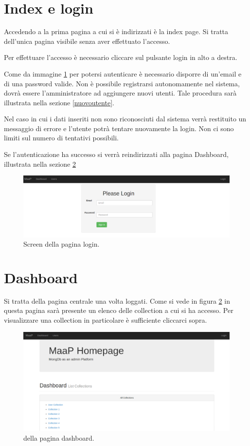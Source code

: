\section{Index e login}

Accedendo a \ProjectName{} la prima pagina a cui si è indirizzati è la index page.
Si tratta dell'unica pagina visibile senza aver effettuato l'accesso.

Per effettuare l'accesso è necessario cliccare sul pulsante login in alto a destra.

Come da immagine \ref{loginfig} per potersi autenticare è necessario disporre di un'email e di una password valide.
Non è possibile registrarsi autonomamente nel sistema, dovrà essere l'amministratore ad aggiungere nuovi utenti. Tale procedura sarà illustrata nella sezione \ref{nuovoutente}.

Nel caso in cui i dati inseriti non sono riconosciuti dal sistema verrà restituito un messaggio di errore e l'utente potrà tentare nuovamente la login. Non ci sono limiti sul numero di tentativi possibili.

Se l'autenticazione ha successo si verrà reindirizzati alla pagina Dashboard, illustrata nella sezione \ref{dashboard}
\begin{figure}[h]
	\label{loginfig}
	\centering \includegraphics[width=1\textwidth]{login.png}
	\caption{Screen della pagina login.}
\end{figure}

\section{Dashboard}
 \label{dashboard}
 
Si tratta della pagina centrale una volta loggati. Come si vede in figura \ref{dashboardfig} in questa pagina sarà presente un elenco delle collection a cui si ha accesso. Per visualizzare una collection in particolare è sufficiente cliccarci sopra.

\begin{figure}[h]
	\label{dashboardfig}
	\centering \includegraphics[width=1\textwidth]{dashboard.png}
	\caption{della pagina dashboard. }
\end{figure}

